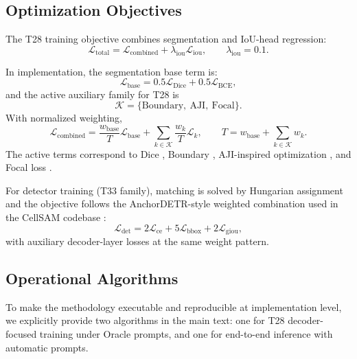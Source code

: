 \subsection{Optimization Objectives}\label{optimization-objectives}

The T28 training objective combines segmentation and IoU-head regression:
\begin{equation}
\mathcal{L}_{\mathrm{total}} = \mathcal{L}_{\mathrm{combined}} + \lambda_{\mathrm{iou}}\mathcal{L}_{\mathrm{iou}}, \qquad \lambda_{\mathrm{iou}} = 0.1.
\end{equation}

In implementation, the segmentation base term is:
\begin{equation}
\mathcal{L}_{\mathrm{base}} = 0.5\mathcal{L}_{\mathrm{Dice}} + 0.5\mathcal{L}_{\mathrm{BCE}},
\end{equation}
and the active auxiliary family for T28 is
\begin{equation}
\mathcal{K}=\{\mathrm{Boundary},\ \mathrm{AJI},\ \mathrm{Focal}\}.
\end{equation}
With normalized weighting,
\begin{equation}
\mathcal{L}_{\mathrm{combined}} =
\frac{w_{\mathrm{base}}}{T}\mathcal{L}_{\mathrm{base}} +
\sum_{k\in\mathcal{K}}\frac{w_k}{T}\mathcal{L}_k, \qquad
T = w_{\mathrm{base}} + \sum_{k\in\mathcal{K}} w_k.
\end{equation}
The active terms correspond to Dice \cite{milletari2016vnet}, Boundary \cite{kervadec2019boundary}, AJI-inspired optimization \cite{kumar2017aji}, and Focal loss \cite{lin2017focal}.

For detector training (T33 family), matching is solved by Hungarian assignment \cite{kuhn1955hungarian} and the objective follows the AnchorDETR-style weighted combination used in the CellSAM codebase \cite{israel2024cellsam}:
\begin{equation}
\mathcal{L}_{\mathrm{det}} = 2\mathcal{L}_{\mathrm{ce}} + 5\mathcal{L}_{\mathrm{bbox}} + 2\mathcal{L}_{\mathrm{giou}},
\end{equation}
with auxiliary decoder-layer losses at the same weight pattern.

\subsection{Operational Algorithms}\label{operational-algorithms}

To make the methodology executable and reproducible at implementation level, we explicitly provide two algorithms in the main text: one for T28 decoder-focused training under Oracle prompts, and one for end-to-end inference with automatic prompts.

